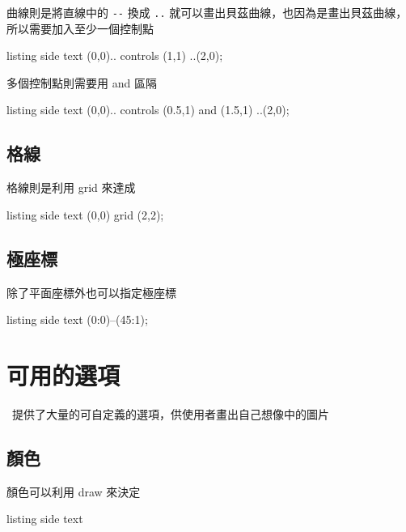 曲線則是將直線中的 \verb`--` 換成 \verb`..` 就可以畫出貝茲曲線，也因為是畫出貝茲曲線，所以需要加入至少一個控制點

\begin{tcblisting}{listing side text}
\tikz \draw (0,0).. controls (1,1) ..(2,0);
\end{tcblisting}

多個控制點則需要用 and 區隔

\begin{tcblisting}{listing side text}
\tikz \draw (0,0).. controls (0.5,1) and (1.5,1) ..(2,0);
\end{tcblisting}

\subsection{格線}

格線則是利用 grid 來達成

\begin{tcblisting}{listing side text}
\tikz \draw (0,0) grid (2,2);
\end{tcblisting}

\subsection{極座標}

除了平面座標外也可以指定極座標

\begin{tcblisting}{listing side text}
\tikz \draw (0:0)--(45:1);
\end{tcblisting}

\section{可用的選項}

\TikZ\ 提供了大量的可自定義的選項，供使用者畫出自己想像中的圖片

\subsection{顏色}

顏色可以利用 draw 來決定

\begin{tcblisting}{listing side text}
\end{tcblisting}

